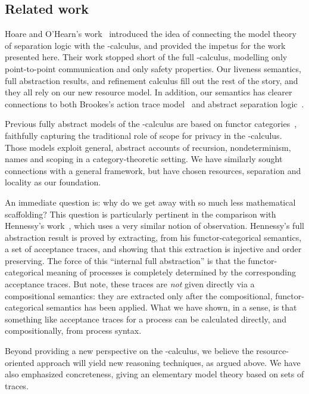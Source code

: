 \documentclass{entcs}
\begin{document}
\subsection{Related work}
\label{sec:related}

Hoare and O'Hearn's work~\cite{Hoare2008} introduced the idea of
connecting the model theory of separation logic with the
-calculus, and provided the impetus for the work presented here.
Their work stopped short of the full -calculus, modelling only
point-to-point communication and only safety properties.  Our liveness
semantics, full abstraction results, and refinement calculus fill out
the rest of the story, and they all rely on our new resource model.
In addition, our semantics has clearer connections to both Brookes's
action trace model~\cite{Brookes2002} and abstract separation
logic~\cite{Calcagno2007}.

Previous fully abstract models of the -calculus are based on
functor categories~\cite{Stark2002,Hennessy2002,Fiore2002}, faithfully
capturing the traditional role of scope for privacy in the
-calculus.  Those models exploit general, abstract accounts of
recursion, nondeterminism, names and scoping in a category-theoretic
setting.  We have similarly sought connections with a general
framework, but have chosen resources, separation and locality as our
foundation.  

An immediate question is: why do we get away with so much less
mathematical scaffolding?  This question is particularly pertinent in
the comparison with Hennessy's work~\cite{Hennessy2002}, which uses a
very similar notion of observation.  Hennessy's full abstraction
result is proved by extracting, from his functor-categorical
semantics, a set of acceptance traces, and showing that this
extraction is injective and order preserving.  The force of this
``internal full abstraction'' is that the functor-categorical meaning
of processes is completely determined by the corresponding acceptance
traces.  But note, these traces are \emph{not} given directly via a
compositional semantics: they are extracted only after the
compositional, functor-categorical semantics has been applied.  What
we have shown, in a sense, is that something like acceptance traces
for a process can be calculated directly, and compositionally, from
process syntax.

Beyond providing a new perspective on the -calculus,
we believe the resource-oriented approach will yield new reasoning
techniques, as argued above.  We have also emphasized concreteness,
giving an elementary model theory based on sets of traces.
\end{document}
